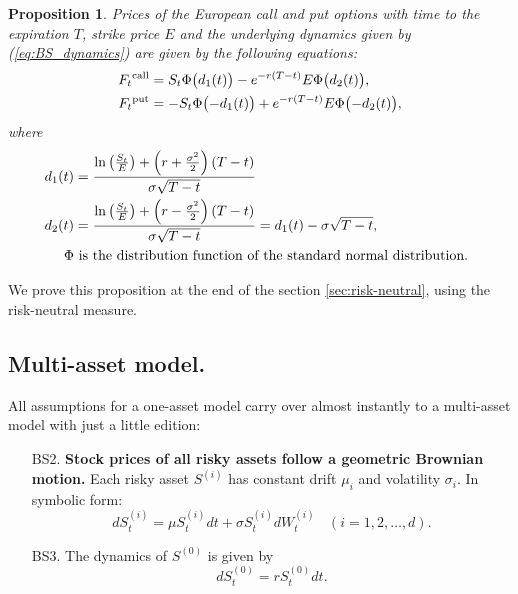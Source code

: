 \documentclass[a4paper,11pt, twoside]{book}
\newtheorem{prop}[thm]{Proposition}
\theoremstyle{definition}
\theoremstyle{remark}
\begin{document}
\begin{prop}
\label{prop:BSFormula}
Prices of the European call and put options with time to the expiration $T$, strike price $E$ and the underlying dynamics given by (\ref{eq:BS_dynamics}) are given by the following equations:
\begin{equation*}
  \begin{split}
    F_t\textsuperscript{call} &= S_t \Phi\bigl( d_1(t) \bigr) - e^{-r(T-t)} E \Phi\bigl(d_2(t) \bigr),\\
    F_t\textsuperscript{put} &= -S_t \Phi\bigl(-d_1(t) \bigr) + e^{-r(T-t)} E \Phi\bigl(-d_2(t) \bigr), 
  \end{split}
\end{equation*}
where
\begin{align*}
d_1(t) &= \frac{\ln\left(\frac{S_t}{E}\right)+\left(r+\frac{\sigma^{2}}{2}\right)(T-t)}{\sigma\sqrt{T-t}}\\
d_2(t) &= \frac{\ln\left(\frac{S_t}{E}\right)+\left(r-\frac{\sigma^{2}}{2}\right)(T-t)}{\sigma\sqrt{T-t}} = d_{1}(t)-\sigma\sqrt{T-t},\\
\Phi & \hbox{ is the distribution function of the standard normal distribution. } 
\end{align*}
\end{prop}
We prove this proposition at the end of the section \ref{sec:risk-neutral}, using the risk-neutral measure.

\subsection{Multi-asset model.}
All assumptions for a one-asset model carry over almost instantly to a multi-asset model with just a little edition:
\begin{enumerate}
 \item[BS2.] \textbf{Stock prices of all risky assets follow a geometric Brownian motion.} Each risky asset $S^{(i)}$ has constant drift $\mu_i$ and volatility $\sigma_i$. In symbolic form:
\begin{equation}
 \label{eq:BS_multi_dynamics}
 dS^{(i)}_t = \mu S^{(i)}_t dt + \sigma S^{(i)}_t dW^{(i)}_t\ \ \ \ (i=1,2,\ldots,d). 
\end{equation}
  \item[BS3.]  The dynamics of $S^{(0)}$ is given by 
\[ dS^{(0)}_t = rS^{(0)}_t dt. \]
\end{enumerate}
  
\end{document}
